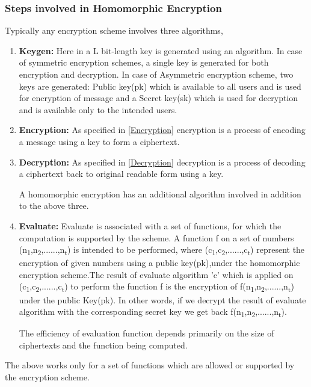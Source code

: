 
\subsubsection{Steps involved in Homomorphic Encryption} \label{steps}
Typically any encryption scheme involves three algorithms,
\begin{enumerate}
    \item 
    \textbf{Keygen:} Here in a L bit-length key is generated using an algorithm. In case of symmetric encryption schemes, a single key is generated for both encryption and decryption. In case of Asymmetric encryption scheme, two keys are generated: Public key(pk) which is available to all users and is used for encryption of message and a Secret key(sk) which is used for decryption and is available only to the intended users.
   \item
    \textbf{Encryption:} As specified in \ref{Encryption} encryption is a process of encoding a message using a key to form a ciphertext.
    \item
    \textbf{Decryption:} As specified in \ref{Decryption} decryption is a process of decoding a ciphertext back to original readable form using a key.
   
   \noindent A homomorphic encryption has an additional algorithm involved in addition to the above three.
    \item 
     \textbf{Evaluate:} Evaluate is associated with a set of functions, for which the computation is supported by the scheme. A function f on a set of numbers (n\textsubscript{1},n\textsubscript{2},......,n\textsubscript{t}) is intended to be performed, where (c\textsubscript{1},c\textsubscript{2},......,c\textsubscript{t}) represent the encryption of given numbers using a public key(pk),under the homomorphic encryption scheme.The result of evaluate algorithm 'c' which is applied on (c\textsubscript{1},c\textsubscript{2},......,c\textsubscript{t}) to perform the function f is the encryption of f(n\textsubscript{1},n\textsubscript{2},......,n\textsubscript{t}) under the public Key(pk). In other words, if we decrypt the result of evaluate algorithm with the corresponding secret key we get back f(n\textsubscript{1},n\textsubscript{2},......,n\textsubscript{t}).
     
     \noindent The efficiency of evaluation function depends primarily on the size of ciphertexts and the function being computed.
     \end{enumerate}
     The above works only for a set of functions which are allowed or supported by the encryption scheme. 
    

